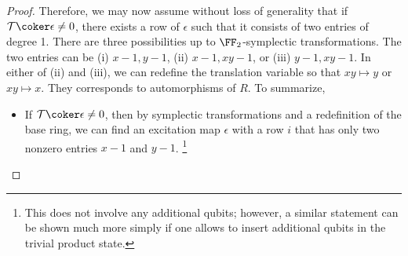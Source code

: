 \begin{proof}
Therefore, we may now assume without loss of generality 
that if $\mathcal T \coker \epsilon \neq 0$,
there exists a row of $\epsilon$ such that it consists of two entries of degree 1.
There are three possibilities up to $\FF_2$-symplectic transformations.
The two entries can be (i) $x-1,y-1$, (ii) $x-1, xy-1$, or (iii) $y-1,xy-1$.
In either of (ii) and (iii),
we can redefine the translation variable so that $xy \mapsto y$ or $xy \mapsto x$.
They corresponds to automorphisms of $R$.
To summarize,
\begin{itemize}
\item[($\bullet$)] If $\mathcal T \coker \epsilon \neq 0$, then 
by symplectic transformations and a redefinition of the base ring,
we can find an excitation map $\epsilon$ with a row $i$
that has only two nonzero entries $x-1$ and $y-1$.%
\footnote{
This does not involve any additional qubits;
however, a similar statement can be shown much more simply
if one allows to insert additional qubits in the trivial product state.}
\end{itemize}


\end{proof}
